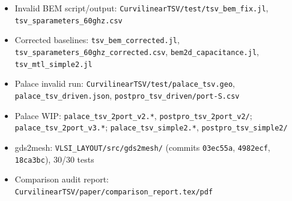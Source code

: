 \documentclass[12pt]{article}
\theoremstyle{definition}
\begin{document}
\begin{itemize}
\item Invalid BEM script/output: \texttt{CurvilinearTSV/test/tsv\_bem\_fix.jl}, \texttt{tsv\_sparameters\_60ghz.csv}
\item Corrected baselines: \texttt{tsv\_bem\_corrected.jl}, \texttt{tsv\_sparameters\_60ghz\_corrected.csv}, \texttt{bem2d\_capacitance.jl}, \texttt{tsv\_mtl\_simple2.jl}
\item Palace invalid run: \texttt{CurvilinearTSV/test/palace\_tsv.geo}, \texttt{palace\_tsv\_driven.json}, \texttt{postpro\_tsv\_driven/port-S.csv}
\item Palace WIP: \texttt{palace\_tsv\_2port\_v2.*}, \texttt{postpro\_tsv\_2port\_v2/}; \texttt{palace\_tsv\_2port\_v3.*}; \texttt{palace\_tsv\_simple2.*}, \texttt{postpro\_tsv\_simple2/}
\item gds2mesh: \texttt{VLSI\_LAYOUT/src/gds2mesh/} (commits \texttt{03ec55a}, \texttt{4982ecf}, \texttt{18ca3bc}), 30/30 tests
\item Comparison audit report: \texttt{CurvilinearTSV/paper/comparison\_report.tex/pdf}
\end{itemize}
\end{document}
